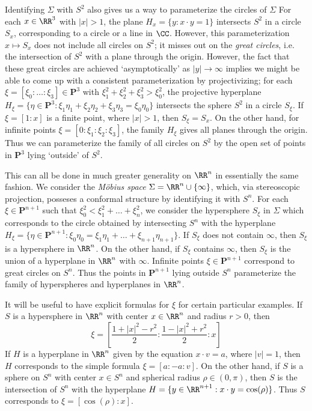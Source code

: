Identifying $\Sigma$ with $S^2$ also gives us a way to parameterize the circles of $\Sigma$ For each $x \in \RR^3$ with $|x| > 1$, the plane $H_x = \{ y : x \cdot y = 1 \}$ intersects $S^2$ in a circle $S_x$, corresponding to a circle or a line in $\CC$. However, this parameterization $x \mapsto S_x$ does not include all circles on $S^2$; it misses out on the \emph{great circles}, i.e. the intersection of $S^2$ with a plane through the origin. However, the fact that these great circles are achieved `asymptotically' as $|y| \to \infty$ implies we might be able to come up with a consistent parameterization by projectivizing; for each $\xi = [\xi_0: \dots : \xi_3] \in \mathbf{P}^3$ with $\xi_1^2 + \xi_2^2 + \xi_3^2 > \xi_0^2$, the projective hyperplane $H_\xi = \{ \eta \in \mathbf{P}^3: \xi_1\eta_1 + \xi_2 \eta_2 + \xi_3 \eta_3 = \xi_0 \eta_0 \}$ intersects the sphere $S^2$ in a circle $S_\xi$. If $\xi = [1:x]$ is a finite point, where $|x| > 1$, then $S_\xi = S_x$. On the other hand, for infinite points $\xi = [0:\xi_1:\xi_2:\xi_3]$, the family $H_\xi$ gives all planes through the origin. Thus we can parameterize the family of all circles on $S^2$ by the open set of points in $\mathbf{P}^3$ lying `outside' of $S^2$.

This can all be done in much greater generality on $\RR^n$ in essentially the same fashion. We consider the \emph{M\"{o}bius space} $\Sigma = \RR^n \cup \{ \infty \}$, which, via stereoscopic projection, posseses a conformal structure by identifying it with $S^n$. For each $\xi \in \mathbf{P}^{n+1}$ such that $\xi_0^2 < \xi_1^2 + \dots + \xi_n^2$, we consider the hypersphere $S_\xi$ in $\Sigma$ which corresponds to the circle obtained by intersecting $S^n$ with the hyperplane $H_\xi = \{ \eta \in \mathbf{P}^{n+1} : \xi_0\eta_0 = \xi_1\eta_1 + \dots + \xi_{n+1} \eta_{n+1} \}$. If $S_\xi$ does not contain $\infty$, then $S_\xi$ is a hypersphere in $\RR^n$. On the other hand, if $S_\xi$ contains $\infty$, then $S_\xi$ is the union of a hyperplane in $\RR^n$ with $\infty$. Infinite points $\xi \in \mathbf{P}^{n+1}$ correspond to great circles on $S^n$. Thus the points in $\mathbf{P}^{n+1}$ lying outside $S^n$ parameterize the family of hyperspheres and hyperplanes in $\RR^n$.

It will be useful to have explicit formulas for $\xi$ for certain particular examples. If $S$ is a hypersphere in $\RR^n$ with center $x \in \RR^n$ and radius $r > 0$, then
%
\[ \xi = \left[ \frac{1 + |x|^2 - r^2}{2}: \frac{1-|x|^2+r^2}{2}: x \right] \]
%
If $H$ is a hyperplane in $\RR^n$ given by the equation $x \cdot v = a$, where $|v| = 1$, then $H$ corresponds to the simple formula $\xi = [a: -a: v]$. On the other hand, if $S$ is a sphere on $S^n$ with center $x \in S^n$ and spherical radius $\rho \in (0,\pi)$, then $S$ is the intersection of $S^n$ with the hyperplane $H = \{ y \in \RR^{n+1}: x \cdot y = \cos(\rho) \}$. Thus $S$ corresponds to $\xi = [\cos(\rho):x]$.

